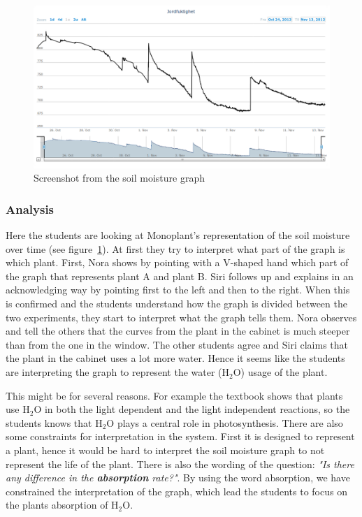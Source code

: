 \begin{figure}
	\centering
	\includegraphics[width=1.0\textwidth]{img/dataandanalasys/soilmoisturegraph.png}
	\caption{Screenshot from the soil moisture graph}
	\label{fig:soilmoistscreenshot}
\end{figure}

\subsubsection*{Analysis}
Here the students are looking at Monoplant's representation of the soil moisture over time (see figure~\ref{fig:soilmoistscreenshot}). At first they try to interpret what part of the graph is which plant. First, Nora shows by pointing with a V-shaped hand which part of the graph that represents plant A and plant B. Siri follows up and explains in an acknowledging way by pointing first to the left and then to the right. When this is confirmed and the students understand how the graph is divided between the two experiments, they start to interpret what the graph tells them. Nora observes and tell the others that the curves from the plant in the cabinet is much steeper than from the one in the window. The other students agree and Siri claims that the plant in the cabinet uses a lot more water. Hence it seems like the students are interpreting the graph to represent the water ($\text{H}_2\text{O}$) usage of the plant. 

This might be for several reasons. For example the textbook shows that plants use $\text{H}_2\text{O}$ in both the light dependent and the light independent reactions, so the students knows that $\text{H}_2\text{O}$ plays a central role in photosynthesis. There are also some constraints for interpretation in the system. First it is designed to represent a plant, hence it would be hard to interpret the soil moisture graph to not represent the life of the plant. There is also the wording of the question: \emph{"Is there any difference in the \textbf{absorption} rate?"}. By using the word absorption, we have constrained the interpretation of the graph, which lead the students to focus on the plants absorption of $\text{H}_2\text{O}$.